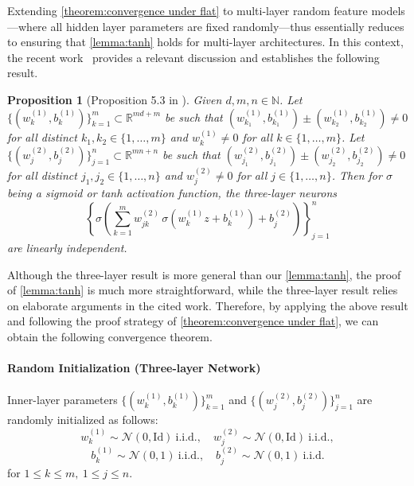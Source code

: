 \documentclass{article}
\newtheorem{proposition}{Proposition}
\begin{document}
Extending \cref{theorem:convergence under flat} to multi-layer random feature models---where all hidden layer parameters are fixed randomly---thus essentially reduces to ensuring that \cref{lemma:tanh} holds for multi-layer architectures. 
In this context, the recent work~\cite{zhang2024linear} provides a relevant discussion and establishes the following result.
\begin{proposition}[Proposition 5.3 in \cite{zhang2024linear}]
Given $d, m, n \in \mathbb{N}$. Let $\{(w_k^{(1)}, b_k^{(1)})\}_{k=1}^m \subset \mathbb{R}^{md + m}$ be such that $(w_{k_1}^{(1)}, b_{k_1}^{(1)}) \pm (w_{k_2}^{(1)}, b_{k_2}^{(1)}) \neq 0$ for all distinct $k_1, k_2 \in \{1, \dots, m\}$ and $w_k^{(1)} \neq 0$ for all $k \in \{1, \dots, m\}$. Let $\{(w_j^{(2)}, b_j^{(2)})\}_{j=1}^n \subset \mathbb{R}^{mn + n}$ be such that $(w_{j_1}^{(2)}, b_{j_1}^{(2)}) \pm (w_{j_2}^{(2)}, b_{j_2}^{(2)}) \neq 0$ for all distinct $j_1, j_2 \in \{1, \dots, n\}$ and $w_j^{(2)} \neq 0$ for all $j \in \{1, \dots, n\}$. Then for $\sigma$ being a sigmoid or tanh activation function, the three-layer neurons
\[
\left\{
\sigma \left(
   \sum_{k=1}^m w_{jk}^{(2)}\, \sigma \left( w_k^{(1)} z + b_k^{(1)} \right) + b_j^{(2)}
   \right)
\right\}_{j=1}^n
\]
are linearly independent.
\end{proposition}
Although the three-layer result is more general than our \cref{lemma:tanh}, the proof of \cref{lemma:tanh} is much more straightforward, while the three-layer result relies on elaborate arguments in the cited work.
Therefore, by applying the above result and following the proof strategy of \cref{theorem:convergence under flat}, we can obtain the following convergence theorem.
\paragraph{Random Initialization (Three-layer Network)}
Inner-layer parameters 
\(\{(w_k^{(1)}, b_k^{(1)})\}_{k=1}^{m}\) 
and
\(\{(w_j^{(2)}, b_j^{(2)})\}_{j=1}^{n}\)
are randomly initialized as follows:
\[
w_k^{(1)} \sim \mathcal{N}(0, \mathrm{Id}) \ \text{i.i.d.}, \quad
w_j^{(2)} \sim \mathcal{N}(0, \mathrm{Id}) \ \text{i.i.d.},
\]
\[
b_k^{(1)} \sim \mathcal{N}(0,1) \ \text{i.i.d.}, \quad
b_j^{(2)} \sim \mathcal{N}(0,1) \ \text{i.i.d.} 
\]
for \(1 \leq k \leq m, \ 1 \leq j \leq n\).
\end{document}
